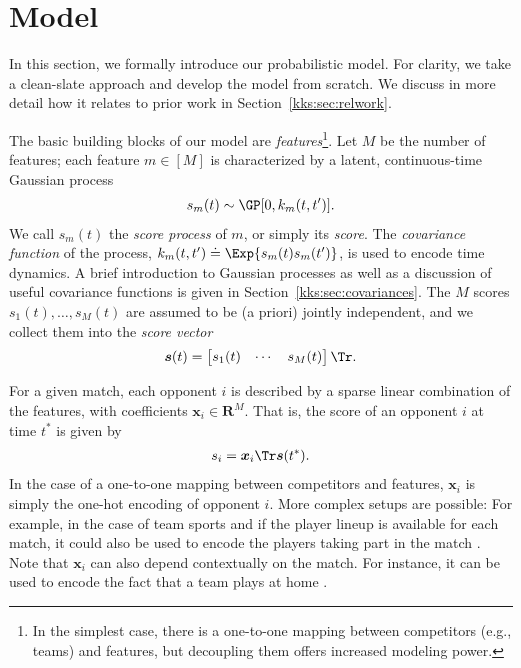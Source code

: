 \section{Model}
\label{kks:sec:model}

In this section, we formally introduce our probabilistic model.
For clarity, we take a clean-slate approach and develop the model from scratch.
We discuss in more detail how it relates to prior work in Section~\ref{kks:sec:relwork}.

The basic building blocks of our model are \emph{features}\footnote{%
	In the simplest case, there is a one-to-one mapping between competitors (e.g., teams) and features, but decoupling them offers increased modeling power.}.
Let $M$ be the number of features; each feature $m \in [M]$ is characterized by a latent, continuous-time Gaussian process
\begin{align}
	\label{kks:eq:score}
	s_m(t) \sim \GP[0, k_m(t, t')].
\end{align}
We call $s_m(t)$ the \emph{score process} of $m$, or simply its \emph{score}.
The \emph{covariance function} of the process, $k_m(t, t') \doteq \Exp{s_m(t) s_m(t')}$, is used to encode time dynamics.
A brief introduction to Gaussian processes as well as a discussion of useful covariance functions is given in Section~\ref{kks:sec:covariances}.
The $M$ scores $s_1(t), \dots, s_M(t)$ are assumed to be (a priori) jointly independent, and we collect them into the \emph{score vector}
\begin{align*}
	\bm{s}(t) = \begin{bmatrix}s_1(t) & \cdots & s_M(t) \end{bmatrix}\Tr.
\end{align*}

For a given match, each opponent $i$ is described by a sparse linear combination of the features, with coefficients $\bm{x}_i \in \mathbf{R}^M$.
That is, the score of an opponent $i$ at time $t^*$ is given by
\begin{align}
	\label{kks:eq:compscore}
	s_i = \bm{x}_i\Tr \bm{s}(t^*).
\end{align}
In the case of a one-to-one mapping between competitors and features, $\bm{x}_i$ is simply the one-hot encoding of opponent $i$.
More complex setups are possible: For example, in the case of team sports and if the player lineup is available for each match, it could also be used to encode the players taking part in the match \citep{maystre2016player}.
Note that $\bm{x}_i$ can also depend contextually on the match.
For instance, it can be used to encode the fact that a team plays at home \citep{agresti2012categorical}.

